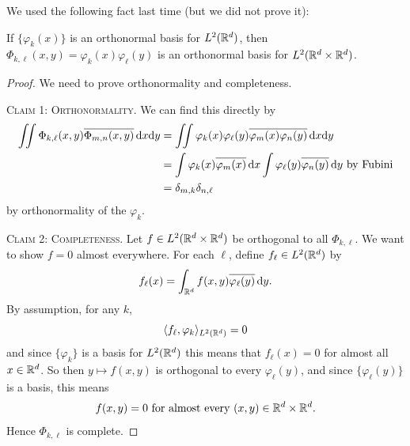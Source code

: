 
\lecture{}

We used the following fact last time (but we did not prove it):

\begin{proposition}
If $\{\varphi_{k}(x)\}$ is an orthonormal basis for $L^{2}(\mathbb{R}^{d})$,
then $\Phi_{k,\ell}(x,y)=\varphi_{k}(x)\varphi_{\ell}(y)$ is an
orthonormal basis for $L^{2}(\mathbb{R}^{d}\times\mathbb{R}^{d})$.
\end{proposition}

\begin{proof}
We need to prove orthonormality and completeness.

\textsc{Claim 1: Orthonormality}. We can find this directly by
\begin{subequations}
  \begin{align}
\iint\Phi_{k,\ell}(x,y)\overline{\Phi_{m,n}(x,y)}\,\mathrm{d} x\mathrm{d} y
&=\iint\varphi_{k}(x)\varphi_{\ell}(y)\overline{\varphi_{m}(x)\varphi_{n}(y)}\,\mathrm{d} x\mathrm{d} y\\
&=\int\varphi_{k}(x)\overline{\varphi_{m}(x)}\,\mathrm{d} x\int\varphi_{\ell}(y)\overline{\varphi_{n}(y)}\,\mathrm{d} y\mbox{ by Fubini}\\
&=\delta_{m,k}\delta_{n,\ell}
  \end{align}
\end{subequations}
by orthonormality of the $\varphi_{k}$.

\textsc{Claim 2: Completeness}. Let $f\in L^{2}(\mathbb{R}^{d}\times\mathbb{R}^{d})$
be orthogonal to all $\Phi_{k,\ell}$. We want to show $f=0$ almost
everywhere.
For each $\ell$, define $f_{\ell}\in L^{2}(\mathbb{R}^{d})$ by
\begin{equation}
f_{\ell}(x)=\int_{\mathbb{R}^{d}}f(x,y)\overline{\varphi_{\ell}(y)}\,\mathrm{d} y.
\end{equation}
By assumption, for any $k$,
\begin{equation}
\langle f_{\ell},\varphi_{k}\rangle_{L^{2}(\mathbb{R}^{d})}=0
\end{equation}
and since $\{\varphi_{k}\}$ is a basis for $L^{2}(\mathbb{R}^{d})$ this means
that $f_{\ell}(x)=0$ for almost all $x\in\mathbb{R}^{d}$. So then $y\mapsto f(x,y)$
is orthogonal to every $\varphi_{\ell}(y)$, and since $\{\varphi_{\ell}(y)\}$
is a basis, this means
\begin{equation}
f(x,y)=0\mbox{ for almost every }(x,y)\in\mathbb{R}^{d}\times\mathbb{R}^{d}.
\end{equation}
Hence $\Phi_{k,\ell}$ is complete.
\end{proof}

